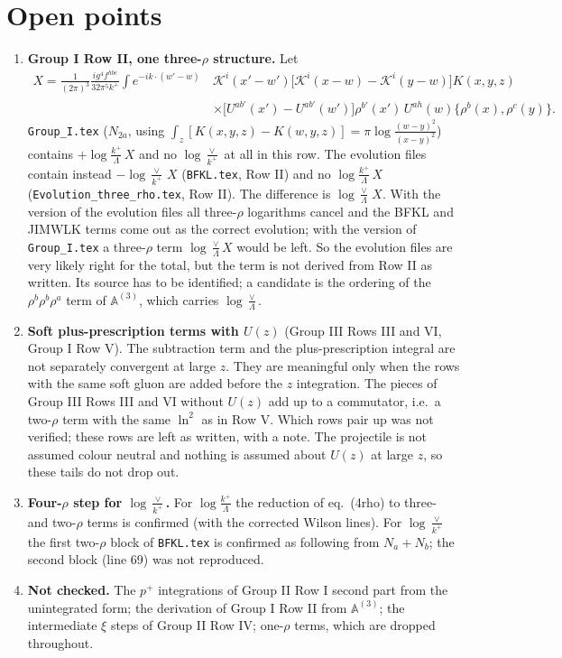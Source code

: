 \documentclass[10pt]{article}
\newcommand{\K}{\mathcal{K}}
\newcommand{\LL}{\log\frac{k^{+}}{\Lambda}}
\newcommand{\LV}{\log\frac{\vee}{k^{+}}}
\begin{document}
\section{Open points}\label{sec:open}
\begin{enumerate}
\item \textbf{Group I Row II, one three-$\rho$ structure.} Let
\begin{align*}
X=\frac{1}{(2\pi)^{3}}\frac{ig^{4}f^{hbc}}{32\pi^{5}k^{+}}\int e^{-ik\cdot(w'-w)}\,&\K^{i}(x'-w')\big[\K^{i}(x-w)-\K^{i}(y-w)\big]K(x,y,z)\\
&\times\big[U^{ab'}(x')-U^{ab'}(w')\big]\rho^{b'}(x')\,U^{ah}(w)\{\rho^{b}(x),\rho^{c}(y)\}.
\end{align*}
\texttt{Group\_I.tex} ($N_{2a}$, using $\int_{z}[K(x,y,z)-K(w,y,z)]=\pi\log\frac{(w-y)^{2}}{(x-y)^{2}}$) contains $+\LL\,X$ and no $\LV$ at all in this row. The evolution files contain instead $-\LV\,X$ (\texttt{BFKL.tex}, Row II) and no $\LL\,X$ (\texttt{Evolution\_three\_rho.tex}, Row II). The difference is $\log\frac{\vee}{\Lambda}\,X$. With the version of the evolution files all three-$\rho$ logarithms cancel and the BFKL and JIMWLK terms come out as the correct evolution; with the version of \texttt{Group\_I.tex} a three-$\rho$ term $\log\frac{\vee}{\Lambda}X$ would be left. So the evolution files are very likely right for the total, but the term is not derived from Row II as written. Its source has to be identified; a candidate is the ordering of the $\rho^{b}\rho^{b}\rho^{a}$ term of $\mathbb{A}^{(3)}$, which carries $\log\frac{\vee}{\Lambda}$.
\item \textbf{Soft plus-prescription terms with $U(z)$} (Group III Rows III and VI, Group I Row V). The subtraction term and the plus-prescription integral are not separately convergent at large $z$. They are meaningful only when the rows with the same soft gluon are added before the $z$ integration. The pieces of Group III Rows III and VI without $U(z)$ add up to a commutator, i.e.\ a two-$\rho$ term with the same $\ln^{2}$ as in Row V. Which rows pair up was not verified; these rows are left as written, with a note. The projectile is not assumed colour neutral and nothing is assumed about $U(z)$ at large $z$, so these tails do not drop out.
\item \textbf{Four-$\rho$ step for $\LV$.} For $\LL$ the reduction of eq.~(4rho) to three- and two-$\rho$ terms is confirmed (with the corrected Wilson lines). For $\LV$ the first two-$\rho$ block of \texttt{BFKL.tex} is confirmed as following from $N_{a}+N_{b}$; the second block (line 69) was not reproduced.
\item \textbf{Not checked.} The $p^{+}$ integrations of Group II Row I second part from the unintegrated form; the derivation of Group I Row II from $\mathbb{A}^{(3)}$; the intermediate $\xi$ steps of Group II Row IV; one-$\rho$ terms, which are dropped throughout.
\end{enumerate}
\end{document}
